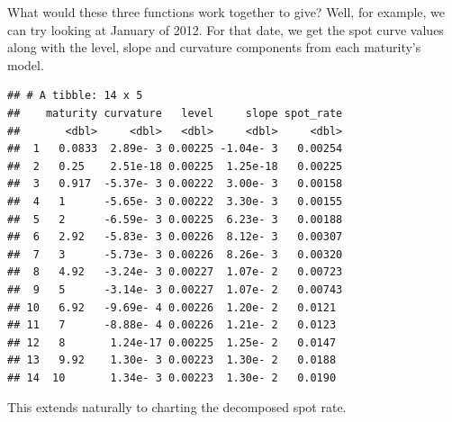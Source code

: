 \documentclass[]{book}
\newenvironment{Shaded}{\begin{snugshade}}{\end{snugshade}}
\newcommand{\KeywordTok}[1]{\textcolor[rgb]{0.13,0.29,0.53}{\textbf{#1}}}
\newcommand{\NormalTok}[1]{#1}
\newcommand{\OperatorTok}[1]{\textcolor[rgb]{0.81,0.36,0.00}{\textbf{#1}}}
\newcommand{\StringTok}[1]{\textcolor[rgb]{0.31,0.60,0.02}{#1}}
\theoremstyle{definition}
\theoremstyle{definition}
\theoremstyle{definition}
\theoremstyle{remark}
\begin{document}
What would these three functions work together to give? Well, for
example, we can try looking at January of 2012. For that date, we get
the spot curve values along with the level, slope and curvature
components from each maturity's model.

\begin{Shaded}
\end{Shaded}

\begin{verbatim}
## # A tibble: 14 x 5
##    maturity curvature   level     slope spot_rate
##       <dbl>     <dbl>   <dbl>     <dbl>     <dbl>
##  1   0.0833  2.89e- 3 0.00225 -1.04e- 3   0.00254
##  2   0.25    2.51e-18 0.00225  1.25e-18   0.00225
##  3   0.917  -5.37e- 3 0.00222  3.00e- 3   0.00158
##  4   1      -5.65e- 3 0.00222  3.30e- 3   0.00155
##  5   2      -6.59e- 3 0.00225  6.23e- 3   0.00188
##  6   2.92   -5.83e- 3 0.00226  8.12e- 3   0.00307
##  7   3      -5.73e- 3 0.00226  8.26e- 3   0.00320
##  8   4.92   -3.24e- 3 0.00227  1.07e- 2   0.00723
##  9   5      -3.14e- 3 0.00227  1.07e- 2   0.00743
## 10   6.92   -9.69e- 4 0.00226  1.20e- 2   0.0121 
## 11   7      -8.88e- 4 0.00226  1.21e- 2   0.0123 
## 12   8       1.24e-17 0.00225  1.25e- 2   0.0147 
## 13   9.92    1.30e- 3 0.00223  1.30e- 2   0.0188 
## 14  10       1.34e- 3 0.00223  1.30e- 2   0.0190
\end{verbatim}

This extends naturally to charting the decomposed spot rate.
\end{document}
